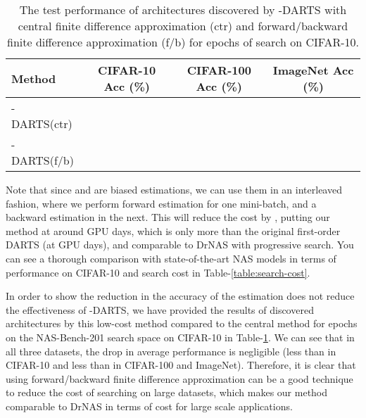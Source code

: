 \documentclass{article} \usepackage{fancyhdr, iclr2023_conference, times}
\newcommand{\mydarts}{-DARTS\xspace}
\begin{document}
\begin{table}[t!]
\centering
\caption{The test performance of architectures discovered by \mydarts with central finite difference approximation (ctr) and forward/backward finite difference approximation (f/b) for  epochs of search on CIFAR-10.} 
\label{table:lambda-darts-est}
\begin{tabular}{l|c|c|c}
\textbf{Method} & \textbf{CIFAR-10 Acc (\%)} & \textbf{CIFAR-100 Acc (\%)} & \textbf{ImageNet Acc (\%)}\\ \hline
    \mydarts (ctr) &  &  &  \\
    \mydarts (f/b) &  &  & 
\end{tabular}
\end{table}Note that since  and  are biased estimations, we can use them in an interleaved fashion, where we perform forward estimation for one mini-batch, and a backward estimation in the next. This will reduce the cost by , putting our method at around  GPU days, which is only  more than the original first-order DARTS (at  GPU days), and comparable to DrNAS with progressive search. You can see a thorough comparison with state-of-the-art NAS models in terms of performance on CIFAR-10 and search cost in Table-\ref{table:search-cost}.
\par In order to show the reduction in the accuracy of the estimation does not reduce the effectiveness of \mydarts, we have provided the results of discovered architectures by this low-cost method compared to the central method for  epochs on the NAS-Bench-201 search space on CIFAR-10 in Table-\ref{table:lambda-darts-est}. We can see that in all three datasets, the drop in average performance is negligible (less than  in CIFAR-10 and less than  in CIFAR-100 and ImageNet). Therefore, it is clear that using forward/backward finite difference approximation can be a good technique to reduce the cost of searching on large datasets, which makes our method comparable to DrNAS in terms of cost for large scale applications.
\end{document}
